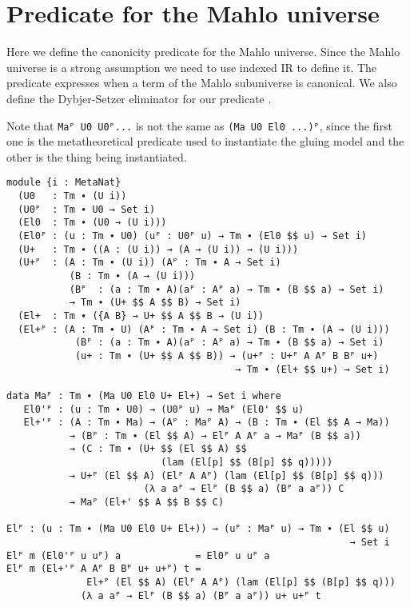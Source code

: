 \section{Predicate for the Mahlo universe}

Here we define the canonicity predicate for the Mahlo universe. Since the Mahlo universe is a strong assumption we need to use indexed IR to define it. The predicate expresses when a term of the Mahlo subuniverse is canonical. We also define the Dybjer-Setzer eliminator for our predicate \cite{dybjer2006indexed}.

Note that \texttt{Maᴾ U0 U0ᴾ...} is not the same as \texttt{(Ma U0 El0 ...)ᴾ}, since the first one is the metatheoretical predicate used to instantiate the gluing model and the other is the thing being instantiated.

\begin{verbatim}
module {i : MetaNat}
  (U0   : Tm ∙ (U i))
  (U0ᴾ  : Tm ∙ U0 → Set i)
  (El0  : Tm ∙ (U0 → (U i)))
  (El0ᴾ : (u : Tm ∙ U0) (uᴾ : U0ᴾ u) → Tm ∙ (El0 $$ u) → Set i)
  (U+   : Tm ∙ ((A : (U i)) → (A → (U i)) → (U i)))
  (U+ᴾ  : (A : Tm ∙ (U i)) (Aᴾ : Tm ∙ A → Set i)
           (B : Tm ∙ (A → (U i)))
           (Bᴾ  : (a : Tm ∙ A)(aᴾ : Aᴾ a) → Tm ∙ (B $$ a) → Set i)
           → Tm ∙ (U+ $$ A $$ B) → Set i)
  (El+  : Tm ∙ ({A B} → U+ $$ A $$ B → (U i))
  (El+ᴾ : (A : Tm ∙ U) (Aᴾ : Tm ∙ A → Set i) (B : Tm ∙ (A → (U i)))
            (Bᴾ : (a : Tm ∙ A)(aᴾ : Aᴾ a) → Tm ∙ (B $$ a) → Set i)
            (u+ : Tm ∙ (U+ $$ A $$ B)) → (u+ᴾ : U+ᴾ A Aᴾ B Bᴾ u+)
                                        → Tm ∙ (El+ $$ u+) → Set i)

data Maᴾ : Tm ∙ (Ma U0 El0 U+ El+) → Set i where
   El0'ᴾ : (u : Tm ∙ U0) → (U0ᴾ u) → Maᴾ (El0' $$ u)
   El+'ᴾ : (A : Tm ∙ Ma) → (Aᴾ : Maᴾ A) → (B : Tm ∙ (El $$ A → Ma))
           → (Bᴾ : Tm ∙ (El $$ A) → Elᴾ A Aᴾ a → Maᴾ (B $$ a))
           → (C : Tm ∙ (U+ $$ (El $$ A) $$
                           (lam (El[p] $$ (B[p] $$ q)))))
           → U+ᴾ (El $$ A) (Elᴾ A Aᴾ) (lam (El[p] $$ (B[p] $$ q)))
                        (λ a aᴾ → Elᴾ (B $$ a) (Bᴾ a aᴾ)) C
           → Maᴾ (El+' $$ A $$ B $$ C)

Elᴾ : (u : Tm ∙ (Ma U0 El0 U+ El+)) → (uᴾ : Maᴾ u) → Tm ∙ (El $$ u)
                                                            → Set i
Elᴾ m (El0'ᴾ u uᴾ) a             = El0ᴾ u uᴾ a
Elᴾ m (El+'ᴾ A Aᴾ B Bᴾ u+ u+ᴾ) t =
              El+ᴾ (El $$ A) (Elᴾ A Aᴾ) (lam (El[p] $$ (B[p] $$ q)))
             (λ a aᴾ → Elᴾ (B $$ a) (Bᴾ a aᴾ)) u+ u+ᴾ t
\end{verbatim}
